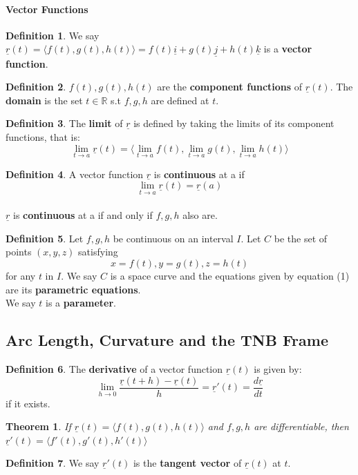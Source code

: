 \documentclass[12 pt]{article}
\newtheorem{thm}{Theorem}
\theoremstyle{definition}
\newtheorem{defn}{Definition}
\begin{document}
\paragraph{Vector Functions}
\begin{defn}
	We say $\underline{r}(t)=\langle f(t),g(t),h(t) \rangle =f(t)\underline{i}+g(t)\underline{j}+h(t)\underline{k}$ is a \textbf{vector function}.
\end{defn}
\begin{defn}
	$f(t),g(t),h(t)$ are the \textbf{component functions} of $\underline{r}(t)$. The \textbf{domain} is the set $t\in \mathbb{R}$ s.t $f,g,h$ are defined at $t$.
\end{defn}
\begin{defn}
	The \textbf{limit} of $\underline{r}$ is defined by taking the limits of its component functions, that is: $$\lim_{t\to a}\underline{r}(t)=\langle \lim_{t\to a} f(t),\lim_{t\to a}g(t),\lim_{t\to a}h(t) \rangle$$
\end{defn}
\begin{defn}
	A vector function $\underline{r}$ is \textbf{continuous} at a if $$\lim_{t \to a}\underline{r}(t)=\underline{r}(a)$$
	\\$\underline{r}$ is \textbf{continuous} at a if and only if $f,g,h$ also are.
\end{defn}
\begin{defn}
	Let $f,g,h$ be continuous on an interval $I$. Let $C$ be the set of points $(x,y,z)$ satisfying 
	\begin{equation}
		x=f(t),y=g(t),z=h(t)
	\end{equation}
	for any $t$ in $I$. We say $C$ is a space curve and the equations given by equation (1) are its \textbf{parametric equations}.
	\\ We say $t$ is a \textbf{parameter}.
\end{defn}
\subsection{Arc Length, Curvature and the TNB Frame}
\begin{defn}
	The \textbf{derivative} of a vector function $\underline{r}(t)$ is given by: 
	\begin{equation*}
			\lim_{h\to 0}\frac{\underline{r}(t+h)-\underline{r}(t)}{h}=\underline{r}'(t)=\frac{d\underline{r}}{dt}
	\end{equation*}
 if it exists.
\end{defn}
\begin{thm}
	If $\underline{r}(t)=\langle f(t),g(t),h(t)\rangle$ and $f,g,h$ are differentiable, then $\underline{r}'(t)=\langle f'(t),g'(t),h'(t)\rangle$
\end{thm}
\begin{defn}
	We say $\underline{r}'(t)$ is the \textbf{tangent vector} of $\underline{r}(t)$ at $t$.
\end{defn}
\end{document}
